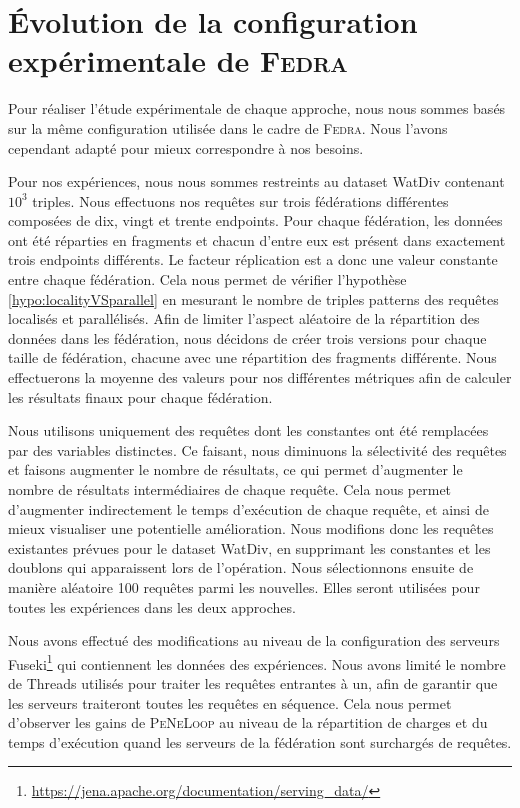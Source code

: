 \documentclass[a4paper]{article}
\def\fedra{\textsc{Fedra}\xspace}
\def\peneloop{\textsc{PeNeLoop}\xspace}
\begin{document}
\section{Évolution de la configuration expérimentale de \fedra}\label{sec:setup}

Pour réaliser l'étude expérimentale de chaque approche, nous nous sommes basés sur la même configuration utilisée dans le cadre de \fedra \cite{montoya2014fedra}. Nous l'avons cependant adapté pour mieux correspondre à nos besoins.

Pour nos expériences, nous nous sommes restreints au dataset WatDiv contenant $10^3$ triples. Nous effectuons nos requêtes sur trois fédérations différentes composées de dix, vingt et trente endpoints. Pour chaque fédération, les données ont été réparties en fragments et chacun d'entre eux est présent dans exactement trois endpoints différents. Le facteur réplication est a donc une valeur constante entre chaque fédération. Cela nous permet de vérifier l'hypothèse \ref{hypo:localityVSparallel} en mesurant le nombre de triples patterns des requêtes localisés et parallélisés. Afin de limiter l'aspect aléatoire de la répartition des données dans les fédération, nous décidons de créer trois versions pour chaque taille de fédération, chacune avec une répartition des fragments différente. Nous effectuerons la moyenne des valeurs pour nos différentes métriques afin de calculer les résultats finaux pour chaque fédération.

Nous utilisons uniquement des requêtes dont les constantes ont été remplacées par des variables distinctes. Ce faisant, nous diminuons la sélectivité des requêtes et faisons augmenter le nombre de résultats, ce qui permet d'augmenter le nombre de résultats intermédiaires de chaque requête. Cela nous permet d'augmenter indirectement le temps d'exécution de chaque requête, et ainsi de mieux visualiser une potentielle amélioration. Nous modifions donc les requêtes existantes prévues pour le dataset WatDiv, en supprimant les constantes et les doublons qui apparaissent lors de l'opération. Nous sélectionnons ensuite de manière aléatoire 100 requêtes parmi les nouvelles. Elles seront utilisées pour toutes les expériences dans les deux approches.

Nous avons effectué des modifications au niveau de la configuration des serveurs Fuseki\footnote{\url{https://jena.apache.org/documentation/serving_data/}} qui contiennent les données des expériences. Nous avons limité le nombre de Threads utilisés pour traiter les requêtes entrantes à un, afin de garantir que les serveurs traiteront toutes les requêtes en séquence. Cela nous permet d'observer les gains de \peneloop au niveau de la répartition de charges et du temps d'exécution quand les serveurs de la fédération sont surchargés de requêtes.
\end{document}
